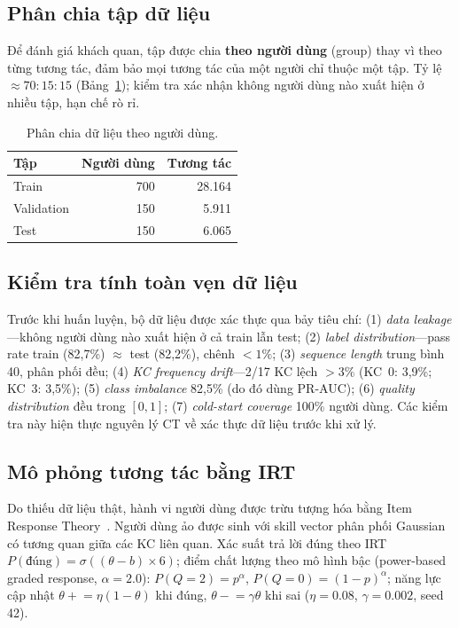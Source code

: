 \documentclass[11pt]{article}
\newcommand{\prauc}{PR-AUC}
\begin{document}
\subsection{Phân chia tập dữ liệu}
Để đánh giá khách quan, tập được chia \textbf{theo người dùng} (group) thay vì theo từng tương tác, đảm bảo mọi tương tác của một người chỉ thuộc một tập. Tỷ lệ $\approx70{:}15{:}15$ (Bảng~\ref{tab:split}); kiểm tra xác nhận không người dùng nào xuất hiện ở nhiều tập, hạn chế rò rỉ.

\begin{table}[t]
  \centering\small
  \begin{tabular}{lrr}
    \toprule
    \textbf{Tập} & \textbf{Người dùng} & \textbf{Tương tác} \\
    \midrule
    Train & 700 & 28.164 \\
    Validation & 150 & 5.911 \\
    Test & 150 & 6.065 \\
    \bottomrule
  \end{tabular}
  \caption{Phân chia dữ liệu theo người dùng.}
  \label{tab:split}
\end{table}

\subsection{Kiểm tra tính toàn vẹn dữ liệu}
Trước khi huấn luyện, bộ dữ liệu được xác thực qua bảy tiêu chí: (1) \textit{data leakage}---không người dùng nào xuất hiện ở cả train lẫn test; (2) \textit{label distribution}---pass rate train (82,7\%) $\approx$ test (82,2\%), chênh $<1\%$; (3) \textit{sequence length} trung bình 40, phân phối đều; (4) \textit{KC frequency drift}---2/17 KC lệch $>3\%$ (KC~0: 3,9\%; KC~3: 3,5\%); (5) \textit{class imbalance} 82,5\% (do đó dùng \prauc{}); (6) \textit{quality distribution} đều trong $[0,1]$; (7) \textit{cold-start coverage} 100\% người dùng. Các kiểm tra này hiện thực nguyên lý CT về xác thực dữ liệu trước khi xử lý.

\subsection{Mô phỏng tương tác bằng IRT}
Do thiếu dữ liệu thật, hành vi người dùng được trừu tượng hóa bằng Item Response Theory~\cite{embretson2000item}. Người dùng ảo được sinh với skill vector phân phối Gaussian có tương quan giữa các KC liên quan. Xác suất trả lời đúng theo IRT $P(\text{đúng})=\sigma((\theta-b)\times6)$; điểm chất lượng theo mô hình bậc (power-based graded response, $\alpha=2.0$): $P(Q{=}2)=p^{\alpha}$, $P(Q{=}0)=(1-p)^{\alpha}$; năng lực cập nhật $\theta\mathrel{+}=\eta(1-\theta)$ khi đúng, $\theta\mathrel{-}=\gamma\theta$ khi sai ($\eta=0.08$, $\gamma=0.002$, seed 42).
\end{document}
